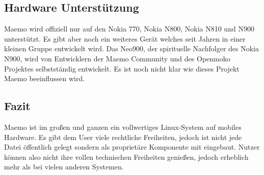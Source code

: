\subsection{Hardware Unterstützung}
Maemo wird offiziell nur auf den Nokia 770\cite{online:maemo1-770}, Nokia N800\cite{online:n800-specs}, Nokia N810\cite{online:n810-specs} und N900\cite{online:n900-specs} unterstützt. Es gibt aber noch ein weiteres Gerät welches seit Jahren in einer kleinen Gruppe entwickelt wird. Das Neo900, der spirituelle Nachfolger des Nokia N900\cite{online:maemo-neo900}, wird von Entwicklern der Maemo Community und des Openmoko Projektes selbstständig entwickelt\cite{online:maemo-neo900team}. Es ist noch nicht klar wie dieses Projekt Maemo beeinflussen wird.\\

\subsection{Fazit}
Maemo ist im großen und ganzen ein vollwertiges Linux-System auf mobiles Hardware. Es gibt dem User viele rechtliche Freiheiten, jedoch ist nicht jede Datei öffentlich gelegt sondern als proprietäre Komponente mit eingebaut. Nutzer können also nicht ihre vollen technischen Freiheiten genießen, jedoch erheblich mehr als bei vielen anderen Systemen.